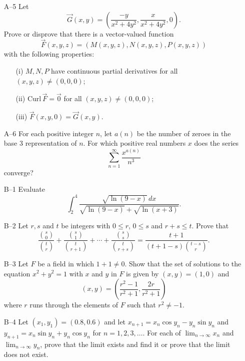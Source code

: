 \documentclass[amssymb,twocolumn,pra,10pt,aps]{revtex4-1}
\begin{document}
\begin{itemize}
\item[A--5]
Let
\[
\vec{G}(x,y) = \left( \frac{-y}{x^2+4y^2}, \frac{x}{x^2+4y^2},0
\right).
\]
Prove or disprove that there is a vector-valued function
\[
\vec{F}(x,y,z) = (M(x,y,z), N(x,y,z), P(x,y,z))
\]
with the following properties:
\begin{enumerate}
\item[(i)] $M,N,P$ have continuous partial derivatives for all
$(x,y,z) \neq (0,0,0)$;
\item[(ii)] $\mathrm{Curl}\,\vec{F} = \vec{0}$ for all $(x,y,z) \neq (0,0,0)$;
\item[(iii)] $\vec{F}(x,y,0) = \vec{G}(x,y)$.
\end{enumerate}

\item[A--6]
For each positive integer $n$, let $a(n)$ be the number of zeroes in
the base 3 representation of $n$. For which positive real numbers $x$
does the series
\[
\sum_{n=1}^\infty \frac{x^{a(n)}}{n^3}
\]
converge?

\item[B--1]
Evaluate
\[
\int_2^4 \frac{\sqrt{\ln(9-x)}\,dx}{\sqrt{\ln(9-x)}+\sqrt{\ln(x+3)}}.
\]

\item[B--2]
Let $r,s$ and $t$ be integers with $0 \leq r$, $0 \leq s$ and $r+s
\leq t$. Prove that
\[
\frac{\binom s0}{\binom tr}
+ \frac{\binom s1}{\binom{t}{r+1}} + \cdots
+ \frac{\binom ss}{\binom{t}{r+s}}
= \frac{t+1}{(t+1-s)\binom{t-s}{r}}.
\]

\item[B--3]
Let $F$ be a field in which $1+1 \neq 0$. Show that the set of
solutions to the equation $x^2+y^2=1$ with $x$ and $y$ in $F$ is given
by $(x,y)=(1,0)$ and
\[
(x,y) = \left( \frac{r^2-1}{r^2+1}, \frac{2r}{r^2+1} \right)
\]
where $r$ runs through the elements of $F$ such that $r^2\neq -1$.

\item[B--4]
Let $(x_1,y_1) = (0.8, 0.6)$ and let $x_{n+1} = x_n \cos y_n - y_n
\sin y_n$ and $y_{n+1}= x_n \sin y_n + y_n \cos y_n$ for
$n=1,2,3,\dots$. For each of $\lim_{n\to \infty} x_n$ and $\lim_{n \to
\infty} y_n$, prove that the limit exists and find it or prove that
the limit does not exist.


\end{itemize}
\end{document}

